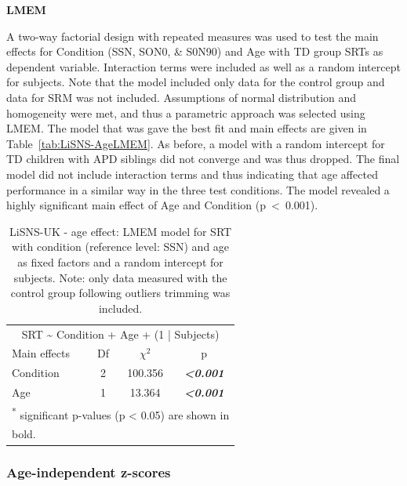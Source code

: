 \documentclass[a4paper, twoside]{templates/ociamthesis}
\begin{document}
\colorbox[HTML]{CCCCFF}{\textbf{LMEM}}

A two-way factorial design with repeated measures was used to test the main effects for Condition (SSN, SON0, \& S0N90) and Age with TD group SRTs as dependent variable. Interaction terms were included as well as a random intercept for subjects. Note that the model included only data for the control group and data for SRM was not included. Assumptions of normal distribution and homogeneity were met, and thus a parametric approach was selected using LMEM. The model that was gave the best fit and main effects are given in Table~\ref{tab:LiSNS-AgeLMEM}. As before, a model with a random intercept for TD children with APD siblings did not converge and was thus dropped. The final model did not include interaction terms and thus indicating that age affected performance in a similar way in the three test conditions. The model revealed a highly significant main effect of Age and Condition (p~\textless~0.001).

\begin{table}

\caption{\label{tab:LiSNS-AgeLMEMTab}LiSNS-UK - age effect: LMEM model for SRT with condition (reference level: SSN) and age as fixed factors and a random intercept for subjects. Note: only data measured with the control group following outliers trimming was included.}
\centering
\begin{tabular}[t]{lcc>{}c}
\toprule
\multicolumn{4}{c}{SRT \textasciitilde{} Condition + Age + (1 | Subjects)} \\
\cmidrule(l{3pt}r{3pt}){1-4}
Main effects & Df & $\chi^{2}$ & p\\
\midrule
Condition & 2 & 100.356 & \em{\textbf{<0.001}}\\
Age & 1 & 13.364 & \em{\textbf{<0.001}}\\
\bottomrule
\multicolumn{4}{l}{\textsuperscript{*} significant p-values (p < 0.05) are shown in}\\
\multicolumn{4}{l}{bold.}\\
\end{tabular}
\end{table}

\hypertarget{age-independent-z-scores-1}{%
\subsubsection*{Age-independent z-scores}\label{age-independent-z-scores-1}}
\end{document}
